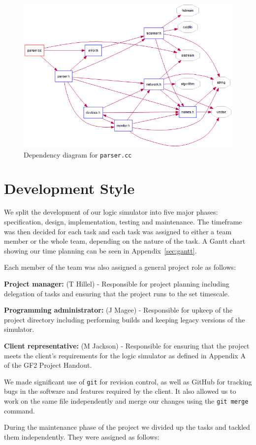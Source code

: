 \documentclass[a4paper,10pt]{article}
\begin{document}
\begin{figure}[h]
 \centering
 \includegraphics[width=.65\textwidth]{parserdeps.png}
 \caption{Dependency diagram for \texttt{parser.cc}}
 \label{fig:deps}
\end{figure}

\section{Development Style}

We split the development of our logic simulator into five major phases: specification, design, implementation, testing and maintenance. The timeframe was then decided for each task and each task was assigned to either a team member or the whole team, depending on the nature of the task. A Gantt chart showing our time planning can be seen in Appendix~\ref{sec:gantt}.

Each member of the team was also assigned a general project role as follows:

\textbf{Project manager:} (T Hillel) - Responsible for project planning including delegation of tasks and ensuring that the project runs to the set timescale.

\textbf{Programming administrator:} (J Magee) - Responsible for upkeep of the project directory including performing builds and keeping legacy versions of the simulator.

\textbf{Client representative:} (M Jackson) - Responsible for ensuring that the project meets the client's requirements for the logic simulator as defined in Appendix A of the GF2 Project Handout.

We made significant use of \texttt{git} for revision control, as well as GitHub for tracking bugs in the software and features required by the client. It also allowed us to work on the same file independently and merge our changes using the \texttt{git merge} command.

During the maintenance phase of the project we divided up the tasks and tackled them independently. They were assigned as follows:
\end{document}
